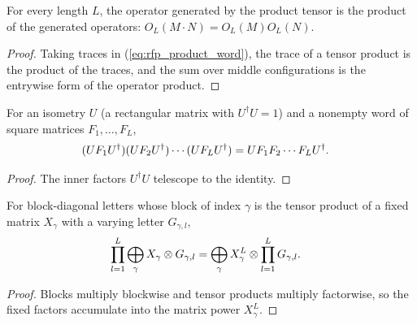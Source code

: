 \begin{lemma}%
    \label{thm:mpdo_operator_product_mpo}
    \leanok
    For every length $L$, the operator generated by the product tensor
    is the product of the generated operators:
    $O_L(M\mathbin{\cdot}N)=O_L(M)O_L(N)$.
\end{lemma}
\begin{proof}\leanok
    Taking traces in (\ref{eq:rfp_product_word}), the trace of a tensor
    product is the product of the traces, and the sum over middle
    configurations is the entrywise form of the operator product.
\end{proof}

\begin{lemma}%
    \label{lem:mpdo_word_product_conjugation}
    \leanok
    For an isometry $U$ (a rectangular matrix with $U^\dagger U=1$) and a
    nonempty word of square matrices $F_1,\ldots,F_L$,
    \begin{align}
        (UF_1U^\dagger)(UF_2U^\dagger)\cdots(UF_LU^\dagger)
         & =U F_1F_2\cdots F_L U^\dagger.
        \notag
    \end{align}
\end{lemma}
\begin{proof}\leanok
    The inner factors $U^\dagger U$ telescope to the identity.
\end{proof}

\begin{lemma}%
    \label{lem:mpdo_word_product_block_kronecker}
    \leanok
    For block-diagonal letters whose block of index $\gamma$ is the tensor
    product of a fixed matrix $X_\gamma$ with a varying letter
    $G_{\gamma,l}$,
    \begin{align}
        \prod_{l=1}^{L}
        \bigoplus_{\gamma}X_\gamma\otimes G_{\gamma,l}
         & =
        \bigoplus_{\gamma}X_\gamma^{L}\otimes
        \prod_{l=1}^{L}G_{\gamma,l}.
        \notag
    \end{align}
\end{lemma}
\begin{proof}\leanok
    Blocks multiply blockwise and tensor products multiply factorwise, so
    the fixed factors accumulate into the matrix power $X_\gamma^L$.
\end{proof}

